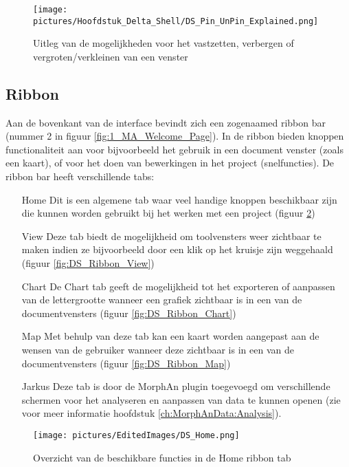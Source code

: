 \begin{figure}[H]
	\centering
		\texttt{[image: pictures/Hoofdstuk\_Delta\_Shell/DS\_Pin\_UnPin\_Explained.png]}
		\caption{Uitleg van de mogelijkheden voor het vastzetten, verbergen of vergroten/verkleinen van een venster}
	\label{fig:3_Pin_UnPin}
\end{figure}

\subsection{Ribbon}
	\label{sec:DS_Toolbar}
Aan de bovenkant van de interface bevindt zich een zogenaamed ribbon bar (nummer 2 in figuur \ref{fig:1_MA_Welcome_Page}). In de ribbon bieden knoppen functionaliteit aan voor bijvoorbeeld het gebruik in een document venster (zoals een kaart), of voor het doen van bewerkingen in het project (snelfuncties). De ribbon bar heeft verschillende tabs:

\begin{itemize}
	\item[Home] Dit is een algemene tab waar veel handige knoppen beschikbaar zijn die kunnen worden gebruikt bij het werken met een project (figuur \ref{fig:DS_Ribbon_Home})
	\item[View] Deze tab biedt de mogelijkheid om toolvensters weer zichtbaar te maken indien ze bijvoorbeeld door een klik op het kruisje zijn weggehaald (figuur \ref{fig:DS_Ribbon_View})
	\item[Chart] De Chart tab geeft de mogelijkheid tot het exporteren of aanpassen van de lettergrootte wanneer een grafiek zichtbaar is in een van de documentvensters (figuur \ref{fig:DS_Ribbon_Chart})
	\item[Map] Met behulp van deze tab kan een kaart worden aangepast aan de wensen van de gebruiker wanneer deze zichtbaar is in een van de documentvensters (figuur \ref{fig:DS_Ribbon_Map})
	\item[Jarkus] Deze tab is door de MorphAn plugin toegevoegd om verschillende schermen voor het analyseren en aanpassen van data te kunnen openen (zie voor meer informatie hoofdstuk \ref{ch:MorphAnData:Analysis}). 
\end{itemize}

\begin{figure}[H]
	\centering
		\texttt{[image: pictures/EditedImages/DS\_Home.png]}
		\caption{Overzicht van de beschikbare functies in de Home ribbon tab}
	\label{fig:DS_Ribbon_Home}
\end{figure}

